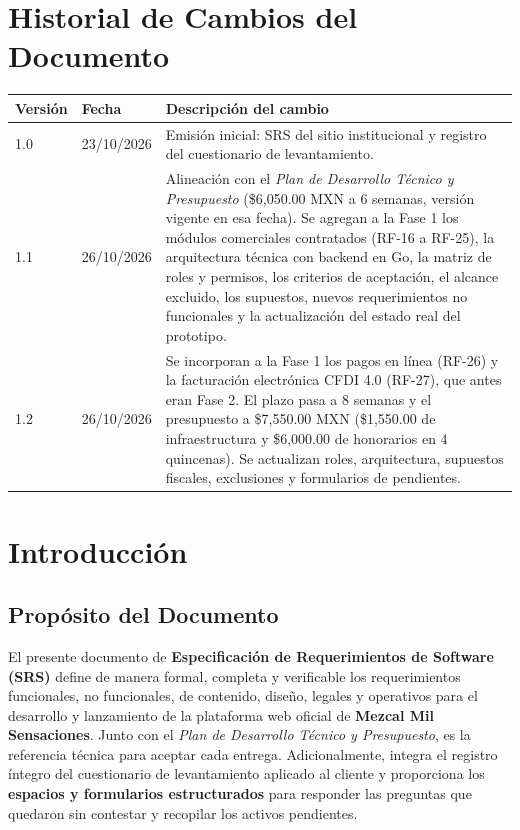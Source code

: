 \documentclass[11pt,letterpaper]{article}
\begin{document}
\section*{Historial de Cambios del Documento}

\renewcommand{\arraystretch}{1.35}
\begin{tabularx}{\linewidth}{@{} l l >{\raggedright\arraybackslash}X @{}}
\toprule
\textbf{Versión} & \textbf{Fecha} & \textbf{Descripción del cambio} \\
\midrule
1.0 & 23/10/2026 & Emisión inicial: SRS del sitio institucional y registro del cuestionario de levantamiento. \\
\midrule
1.1 & 26/10/2026 & Alineación con el \textit{Plan de Desarrollo Técnico y Presupuesto} (\$6,050.00 MXN a 6 semanas, versión vigente en esa fecha). Se agregan a la Fase 1 los módulos comerciales contratados (RF-16 a RF-25), la arquitectura técnica con backend en Go, la matriz de roles y permisos, los criterios de aceptación, el alcance excluido, los supuestos, nuevos requerimientos no funcionales y la actualización del estado real del prototipo. \\
\midrule
1.2 & 26/10/2026 & Se incorporan a la Fase 1 los pagos en línea (RF-26) y la facturación electrónica CFDI 4.0 (RF-27), que antes eran Fase 2. El plazo pasa a 8 semanas y el presupuesto a \$7,550.00 MXN (\$1,550.00 de infraestructura y \$6,000.00 de honorarios en 4 quincenas). Se actualizan roles, arquitectura, supuestos fiscales, exclusiones y formularios de pendientes. \\
\bottomrule
\end{tabularx}

\section{Introducción}

\subsection{Propósito del Documento}
El presente documento de \textbf{Especificación de Requerimientos de Software (SRS)} define de manera formal, completa y verificable los requerimientos funcionales, no funcionales, de contenido, diseño, legales y operativos para el desarrollo y lanzamiento de la plataforma web oficial de \textbf{Mezcal Mil Sensaciones}. Junto con el \textit{Plan de Desarrollo Técnico y Presupuesto}, es la referencia técnica para aceptar cada entrega. Adicionalmente, integra el registro íntegro del cuestionario de levantamiento aplicado al cliente y proporciona los \textbf{espacios y formularios estructurados} para responder las preguntas que quedaron sin contestar y recopilar los activos pendientes.
\end{document}
